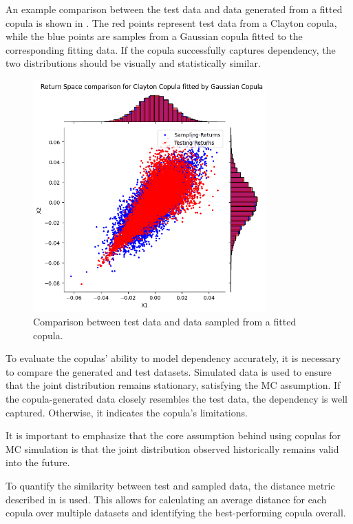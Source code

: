 An example comparison between the test data and data generated from a fitted copula is shown in . The red points represent test data from a Clayton copula, while the blue points are samples from a Gaussian copula fitted to the corresponding fitting data. If the copula successfully captures dependency, the two distributions should be visually and statistically similar.

\begin{figure}
\centering
\includegraphics[width=0.8\textwidth]{4Method/pictures/TestSampleComparison.png}
\caption{Comparison between test data and data sampled from a fitted copula.}
\label{fig:TestSampleComparison}
\end{figure}

To evaluate the copulas’ ability to model dependency accurately, it is necessary to compare the generated and test datasets. Simulated data is used to ensure that the joint distribution remains stationary, satisfying the \gls{MC} assumption. If the copula-generated data closely resembles the test data, the dependency is well captured. Otherwise, it indicates the copula’s limitations.

It is important to emphasize that the core assumption behind using copulas for \gls{MC} simulation is that the joint distribution observed historically remains valid into the future.

To quantify the similarity between test and sampled data, the distance metric described in  is used. This allows for calculating an average distance for each copula over multiple datasets and identifying the best-performing copula overall.

